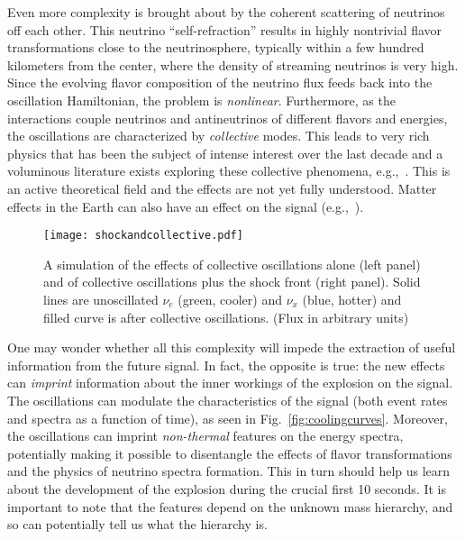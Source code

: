 Even more complexity is brought about by the coherent scattering of neutrinos off each other. This neutrino ``self-refraction'' 
 results in highly nontrivial flavor transformations close to the neutrinosphere, typically within a few hundred kilometers from the center, where the density of streaming neutrinos is very high. Since the evolving flavor composition of the neutrino flux feeds back into the oscillation Hamiltonian, the problem is \emph{nonlinear}. Furthermore, as the interactions couple neutrinos and antineutrinos of different flavors and energies, the oscillations are characterized by \emph{collective} modes. This leads to very rich physics that has been the subject of intense interest over the last decade and a voluminous literature exists exploring these collective phenomena,
e.g.,~\cite{Duan:2005cp,Fogli:2007bk,Raffelt:2007cb,Raffelt:2007xt,EstebanPretel:2008ni,Duan:2009cd,Dasgupta:2009mg,Duan:2010bg,Duan:2010bf,Wu:2014kaa}.  This is an active theoretical field and the effects are not yet fully understood.
Matter effects in the Earth can also have an effect on the signal (e.g.,~\cite{Choubey:2010up}).

\begin{figure}[!htb]
\centering
\texttt{[image: shockandcollective.pdf]}
\caption[Simulated cooling curves from the Garching light progenitor model]{ A simulation of the effects of collective oscillations alone (left panel) and of collective oscillations plus the shock front (right panel). Solid lines are unoscillated $\nu_e$ (green, cooler) and $\nu_x$ (blue, hotter) and filled curve is after collective oscillations. (Flux in arbitrary units)}
\label{fig:shockandcollective}
\end{figure}

One may wonder whether all this complexity will impede the extraction of useful information from the future signal. In fact, the opposite is true: the new effects can \emph{imprint} information about the inner workings of the explosion on the signal. The oscillations can modulate the characteristics of the signal (both event rates and spectra as a function of time), as seen in Fig.~\ref{fig:coolingcurves}. Moreover, the oscillations can imprint \emph{non-thermal} features on the energy spectra, potentially making it possible to disentangle the effects of flavor transformations and the physics of neutrino spectra formation. This in turn should help us learn about the development of the explosion during the crucial first 10 seconds.   It is important to note that the features depend on the unknown mass hierarchy, and so can potentially tell us what the hierarchy is.

